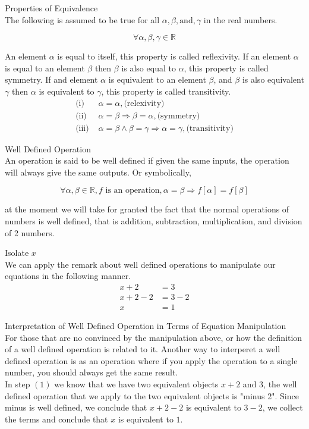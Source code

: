 \documentclass{book}
\begin{document}
  {\axiom Properties of Equivalence \\
     The following is assumed to be true for all $\alpha, \beta, \text{and}, \gamma$ in the real numbers.

    $$\forall \alpha, \beta, \gamma \in \mathbb{R}$$

     An element $\alpha$ is equal to itself, this property is called reflexivity. If an element $\alpha$ is equal to an element $\beta$ then $\beta$ is also equal to $\alpha$, this property is called symmetry. If and element $\alpha$ is equivalent to an element $\beta$, and $\beta$ is also equivalent $\gamma$ then $\alpha$ is equivalent to $\gamma$, this property is called transitivity.
    \begin{align*}
      \text{(i) } & \alpha = \alpha, \text{(relexivity)}\\
      \text{(ii) } & \alpha = \beta \Rightarrow \beta = \alpha, \text{(symmetry)}\\
      \text{(iii) } & \alpha = \beta \land \beta = \gamma \Rightarrow \alpha = \gamma, \text{(transitivity)}
    \end{align*}
  }

  {\remark Well Defined Operation \\
     An operation is said to be well defined if given the same inputs, the operation will always give the same outputs. Or symbolically,

    $$\forall \alpha, \beta \in \mathbb{R}, f \text{ is an operation}, \alpha = \beta \Rightarrow f[\alpha] = f[\beta]$$

     at the moment we will take for granted the fact that the normal operations of numbers is well defined, that is addition, subtraction, multiplication, and division of 2 numbers.\\
  }

  {\example Isolate $x$ \\
     We can apply the remark about well defined operations to manipulate our equations in the following manner.
    \begin{align}
      x + 2 & = 3\\
      x + 2 - 2 & = 3 - 2\\
      x & = 1
    \end{align}
  }

  {\remark Interpretation of Well Defined Operation in Terms of Equation Manipulation \\
    For those that are no convinced by the manipulation above, or how the definition of a well defined operation is related to it. Another way to interperet a well defined operation is as an operation where if you apply the operation to a single number, you should always get the same result.\\

     In step $(1)$ we know that we have two equivalent objects $x + 2$ and $3$, the well defined operation that we apply to the two equivalent objects is "minus 2". Since minus is well defined, we conclude that $x + 2 - 2$ is equivalent to $3 - 2$, we collect the terms and conclude that $x$ is equivalent to $1$.\\
  }
\end{document}
